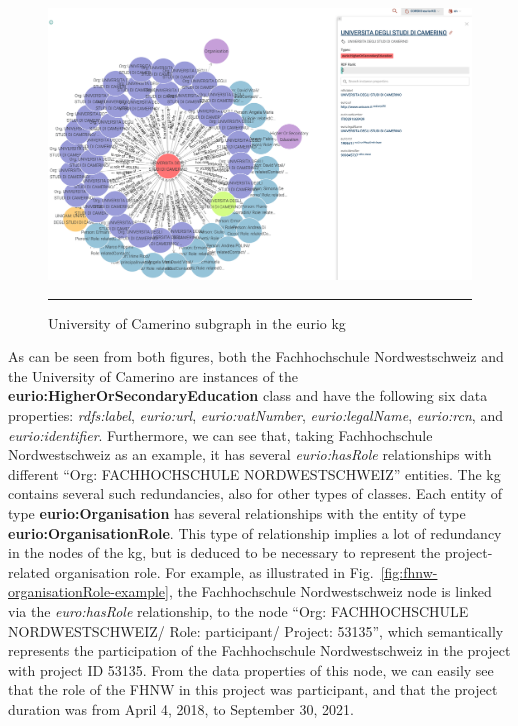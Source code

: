 \begin{figure}[htbp]
    \centering
 \includegraphics[width=.9\textwidth]{figures/architecture/graphdb-unicam.png}
     \rule{35em}{0.5pt}
    \caption{University of Camerino subgraph in the \gls{eurio} \gls{kg}}
 \label{fig:unicam-graphdb}
\end{figure}
\newpage
As can be seen from both figures, both the Fachhochschule Nordwestschweiz and the University of Camerino are instances of the \textbf{eurio:HigherOrSecondaryEducation} class and have the following six data properties: \textit{rdfs:label}, \textit{eurio:url}, \textit{eurio:vatNumber}, \textit{eurio:legalName}, \textit{eurio:rcn}, and \textit{eurio:identifier}.
Furthermore, we can see that, taking Fachhochschule Nordwestschweiz as an example, it has several \textit{eurio:hasRole} relationships with different ``Org: FACHHOCHSCHULE NORDWESTSCHWEIZ'' entities.
The \gls{kg} contains several such redundancies, also for other types of classes.
Each entity of type \textbf{eurio:Organisation} has several relationships with the entity of type \textbf{eurio:OrganisationRole}.
This type of relationship implies a lot of redundancy in the nodes of the \gls{kg}, but is deduced to be necessary to represent the project-related organisation role.
For example, as illustrated in Fig.~\ref{fig:fhnw-organisationRole-example}, the Fachhochschule Nordwestschweiz node is linked via the \textit{euro:hasRole} relationship, to the node ``Org: FACHHOCHSCHULE NORDWESTSCHWEIZ/ Role: participant/ Project: 53135'', which semantically represents the participation of the Fachhochschule Nordwestschweiz in the project with project ID 53135.
From the data properties of this node, we can easily see that the role of the FHNW in this project was participant, and that the project duration was from April 4, 2018, to September 30, 2021.

